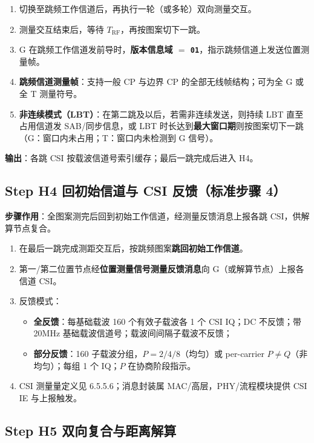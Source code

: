 \documentclass[11pt,a4paper]{ctexart}
\begin{document}
\begin{enumerate}
  \item 切换至跳频工作信道后，再执行一轮（或多轮）双向测量交互。
  \item 测量交互结束后，等待 $T_{\mathrm{RF}}$，再按图案切下一跳。
  \item G 在跳频工作信道发前导时，\textbf{版本信息域 $=$ \texttt{01}}，指示跳频信道上发送位置测量帧。
  \item \textbf{跳频信道测量帧}：支持一般 CP 与边界 CP 的全部无线帧结构；可为全 G 或全 T 测量符号。
  \item \textbf{非连续模式（LBT）}：在第二跳及以后，若需非连续发送，则持续 LBT 直至占用信道发 SAB/同步信息，或 LBT 时长达到\textbf{最大窗口期}则按图案切下一跳（G：窗口内未占用；T：窗口内未检测到 G 信号）。
\end{enumerate}

\textbf{输出}：各跳 CSI 按载波信道号索引缓存；最后一跳完成后进入 H4。

\subsection{Step H4 回初始信道与 CSI 反馈（标准步骤 4）}

\textbf{步骤作用}：全图案测完后回到初始工作信道，经测量反馈消息上报各跳 CSI，供解算节点复合。

\begin{enumerate}
  \item 在最后一跳完成测距交互后，按跳频图案\textbf{跳回初始工作信道}。
  \item 第一/第二位置节点经\textbf{位置测量信号测量反馈消息}向 G（或解算节点）上报各信道 CSI。
  \item 反馈模式：
  \begin{itemize}[nosep]
    \item \textbf{全反馈}：每基础载波 160 个有效子载波各 1 个 CSI IQ；DC 不反馈；带 20MHz 基础载波信道号；载波间间隔子载波不反馈；
    \item \textbf{部分反馈}：160 子载波分组，$P=2/4/8$（均匀）或 per-carrier $P\neq Q$（非均匀）；每组 1 个 IQ；$P$ 在协商阶段指示。
  \end{itemize}
  \item CSI 测量量定义见 6.5.5.6；消息封装属 MAC/高层，PHY/流程模块提供 CSI IE 与上报触发。
\end{enumerate}

\subsection{Step H5 双向复合与距离解算}
\end{document}

